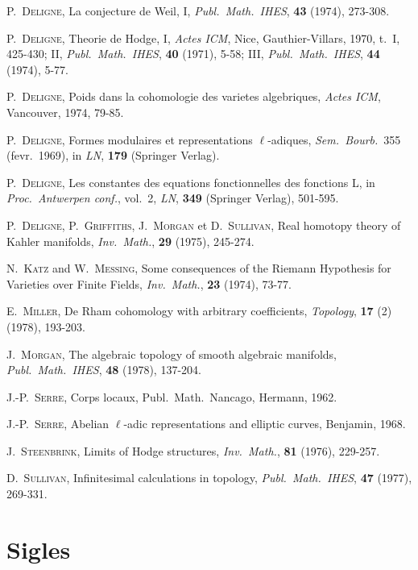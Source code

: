 \documentclass[12pt,a4paper]{article}
\theoremstyle{plain}
\theoremstyle{definition}
\theoremstyle{remark}
\begin{document}
\begin{enumerate}[label={[\arabic*]}]
\item P.\ \textsc{Deligne}, La conjecture de Weil, I, \textit{Publ.\ Math.\ IHES}, \textbf{43} (1974), 273-308.
\item P.\ \textsc{Deligne}, Theorie de Hodge, I, \textit{Actes ICM}, Nice, Gauthier-Villars, 1970, t.\ I, 425-430; II, \textit{Publ.\ Math.\ IHES}, \textbf{40} (1971), 5-58; III, \textit{Publ.\ Math.\ IHES}, \textbf{44} (1974), 5-77.
\item P.\ \textsc{Deligne}, Poids dans la cohomologie des varietes algebriques, \textit{Actes ICM}, Vancouver, 1974, 79-85.
\item P.\ \textsc{Deligne}, Formes modulaires et representations $\ell$-adiques, \textit{Sem.\ Bourb.}\ 355 (fevr.\ 1969), in \textit{LN}, \textbf{179} (Springer Verlag).
\item P.\ \textsc{Deligne}, Les constantes des equations fonctionnelles des fonctions L, in \textit{Proc.\ Antwerpen conf.}, vol.\ 2, \textit{LN}, \textbf{349} (Springer Verlag), 501-595.
\item P.\ \textsc{Deligne}, P.\ \textsc{Griffiths}, J.\ \textsc{Morgan} et D.\ \textsc{Sullivan}, Real homotopy theory of Kahler manifolds, \textit{Inv.\ Math.}, \textbf{29} (1975), 245-274.
\item N.\ \textsc{Katz} and W.\ \textsc{Messing}, Some consequences of the Riemann Hypothesis for Varieties over Finite Fields, \textit{Inv.\ Math.}, \textbf{23} (1974), 73-77.
\item E.\ \textsc{Miller}, De Rham cohomology with arbitrary coefficients, \textit{Topology}, \textbf{17} (2) (1978), 193-203.
\item J.\ \textsc{Morgan}, The algebraic topology of smooth algebraic manifolds, \textit{Publ.\ Math.\ IHES}, \textbf{48} (1978), 137-204.
\item J.-P.\ \textsc{Serre}, Corps locaux, Publ.\ Math.\ Nancago, Hermann, 1962.
\item J.-P.\ \textsc{Serre}, Abelian $\ell$-adic representations and elliptic curves, Benjamin, 1968.
\item J.\ \textsc{Steenbrink}, Limits of Hodge structures, \textit{Inv.\ Math.}, \textbf{81} (1976), 229-257.
\item D.\ \textsc{Sullivan}, Infinitesimal calculations in topology, \textit{Publ.\ Math.\ IHES}, \textbf{47} (1977), 269-331.
\end{enumerate}

\section*{Sigles}
\end{document}
